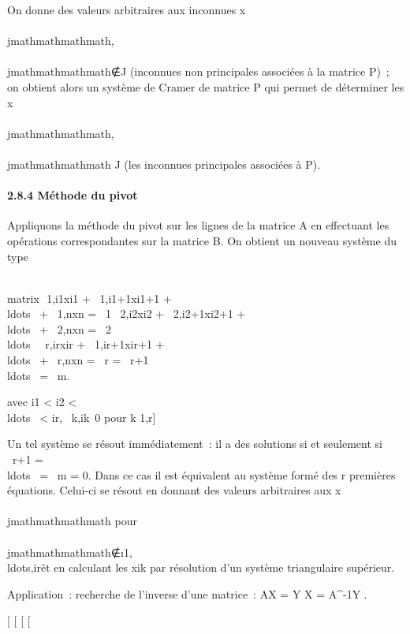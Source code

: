 On donne des valeurs arbitraires aux inconnues x\\\\jmathmathmathmath,
\\\\jmathmathmathmath∉J (inconnues non principales associées à la
matrice P)~; on obtient alors un système de Cramer de matrice P qui
permet de déterminer les x\\\\jmathmathmathmath, \\\\jmathmathmathmath \in J (les inconnues principales
associées à P).

\paragraph{2.8.4 Méthode du pivot}

Appliquons la méthode du pivot sur les lignes de la matrice A en
effectuant les opérations correspondantes sur la matrice B. On obtient
un nouveau système du type

\left
\\matrix\,\alpha~1,i1xi1
+ \alpha~1,i1+1xi1+1 +
\quad \quad
\\ldots~\quad
\quad + \alpha~1,nxn = \beta~1
\cr \alpha~2,i2xi2 +
\alpha~2,i2+1xi2+1 +
\quad
\\ldots~\quad
+ \alpha~2,nxn = \beta~2 \cr
\\ldots~
\cr \alpha~r,irxir +
\alpha~1,ir+1xir+1 +
\\ldots~ +
\alpha~r,nxn = \beta~r  =
\beta~r+1 \cr
\\ldots~
 = \beta~m\right .

avec i1 \textless{} i2 \textless{}
\\ldots~ \textless{}
ir, \alpha~k,ik\neq~0
pour k \in {[}1,r{]}

Un tel système se résout immédiatement~: il a des solutions si et
seulement si \beta~r+1 =
\\ldots~ =
\beta~m = 0. Dans ce cas il est équivalent au système formé des r
premières équations. Celui-ci se résout en donnant des valeurs
arbitraires aux x\\\\jmathmathmathmath pour
\\\\jmathmathmathmath∉\i1,\\ldots,ir\~
et en calculant les xik par résolution d'un système
triangulaire supérieur.

Application~: recherche de l'inverse d'une matrice~: AX = Y
\Leftrightarrow X = A^-1Y .

{[}
{[}
{[}
{[}
